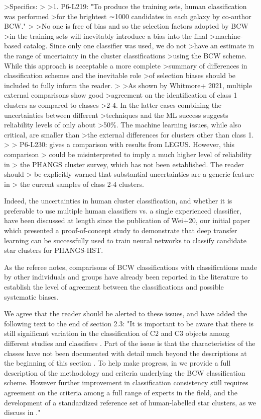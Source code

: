 >Specifics:
>
>1. P6-L219: "To produce the training sets, human classification was performed 
>for the brightest ∼1000 candidates in each galaxy by co-author BCW."
>
>No one is free of bias and so the selection factors adopted by BCW 
>in the training sets will inevitably introduce a bias into the final 
>machine-based catalog. Since only one classifier was used, we do not 
>have an estimate in the range of uncertainty in the cluster classifications 
>using the BCW scheme. While this approach is acceptable a more complete 
>summary of differences in classification schemes and the inevitable role 
>of selection biases should be included to fully inform the reader.
>
>As shown by Whitmore+ 2021, multiple external comparisons show good 
>agreement on the identification of class 1 clusters as compared to classes 
>2-4. In the latter cases combining the uncertainties between different 
>techniques and the ML success suggests reliability levels of only about 
>50\%. The machine learning issues, while also critical, are smaller than 
>the external differences for clusters other than class 1.
>
> P6-L230: gives a comparison with results from LEGUS. However, this comparison 
> could be misinterpreted to imply a much higher level of reliability in 
> the PHANGS cluster survey, which has not been established. The reader should 
> be explicitly warned that substantial uncertainties are a generic feature in 
> the current samples of class 2-4 clusters.

Indeed, the uncertainties in human cluster classification, and whether it is preferable to use multiple human classifiers vs. a single experienced classifier, have been discussed at length since the publication of Wei+20, our initial paper which presented a proof-of-concept study to demonstrate that deep transfer learning can be successfully used to train neural networks to classify candidate star clusters for PHANGS-HST.   

As the referee notes, comparisons of BCW classifications with classifications made by other individuals and groups have already been reported in the literature to establish the level of agreement between the classifications and possible systematic biases.  

We agree that the reader should be alerted to these issues, and have added the following text to the end of section 2.3:
"It is important to be aware that there is still significant variation in the classification of C2 and C3 objects among different studies and classifiers \citep[e.g., discussion in section 6.3.3 of][]{whitmore_star_2021}.  Part of the issue is that the characteristics of the classes have not been documented with detail much beyond the descriptions at the beginning of this section \citep[e.g., see section 2 in both][]{adamo_legacy_2017, perez_starcnet_2021}.  To help make progress, in \citet{whitmore_star_2021} we provide a full description of the methodology and criteria underlying the BCW classification scheme.  However further improvement in classification consistency still requires agreement on the criteria among a full range of experts in the field, and the development of a standardized reference set of human-labelled star clusters, as we discuss in \citet{wei_deep_2020}."


